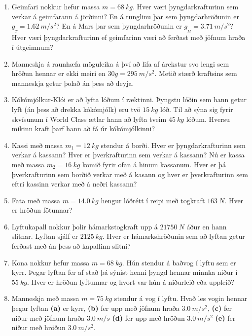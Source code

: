 \ifdefined \wholebook \else\documentclass[oneside]{book}\usepackage{EdlBook}\graphicspath{{figures/}}
\begin{document}
\begin{enumerate}[label = \textbf{Dæmi \thechapter.\arabic*.}]

\item Geimfari nokkur hefur massa $m = \SI{68}{kg}$. Hver væri þyngdarkrafturinn sem verkar á geimfarann á jörðinni? En á tunglinu þar sem þyngdarhröðunin er $g_{_T} = \SI{1.62}{m/s^2}$? En á Mars þar sem þyngdarhröðunin er $g_{_{M}} = \SI{3.71}{m/s^2}$? Hver væri þyngdarkrafturinn ef geimfarinn væri að ferðast með jöfnum hraða í útgeimnum?

\item Manneskja á raunhæfa möguleika á því að lifa af árekstur svo lengi sem hröðun hennar er ekki meiri en $30g = \SI{295}{m/s^2}$. Metið stærð kraftsins sem manneskja getur þolað án þess að deyja.

\item Kókómjólkur-Klói er að lyfta lóðum í ræktinni. Þyngstu lóðin sem hann getur lyft (án þess að drekka kókómjólk) eru tvö $\SI{15}{kg}$ lóð. Til að sýna sig fyrir skvísunum í World Class ætlar hann að lyfta tveim $\SI{45}{kg}$ lóðum. Hversu mikinn kraft þarf hann að fá úr kókómjólkinni?



\item Kassi með massa $m_1 = \SI{12}{kg}$ stendur á borði. Hver er þyngdarkrafturinn sem verkar á kassann? Hver er þverkrafturinn sem verkar á kassann? Nú er kassa með massa $m_2 = \SI{16}{kg}$ komið fyrir ofan á hinum kassanum. Hver er þá þverkrafturinn sem borðið verkar með á kasann og hver er þverkrafturinn sem eftri kassinn verkar með á neðri kassann?

\item Fata með massa $m = \SI{14.0}{kg}$ hengur lóðrétt í reipi með togkraft $\SI{163}{N}$. Hver er hröðun fötunnar?

\item Lyftukapall nokkur þolir hámarkstogkraft upp á $\SI{21750}{N}$ áður en hann slitnar. Lyftan sjálf er $\SI{2125}{kg}$. Hver er hámarkshröðunin sem að lyftan getur ferðast með án þess að kapallinn slitni?

\item Kona nokkur hefur massa $m = \SI{68}{kg}$. Hún stendur á baðvog í lyftu sem er kyrr. Þegar lyftan fer af stað þá sýnist henni þyngd hennar minnka niður í $\SI{55}{kg}$. Hver er hröðun lyftunnar og hvort var hún á niðurleið eða uppleið?

\item Manneskja með massa $m = \SI{75}{kg}$ stendur á vog í lyftu. Hvað les vogin hennar þegar lyftan \textbf{(a)} er kyrr, \textbf{(b)} fer upp með jöfnum hraða $\SI{3.0}{m/s^2}$, \textbf{(c)} fer niður með jöfnum hraða $\SI{3.0}{m/s}$ \textbf{(d)} fer upp með hröðun $\SI{3.0}{m/s^2}$ \textbf{(e)}  fer niður með hröðun $\SI{3.0}{m/s^2}$.


\end{enumerate}
\end{document}
